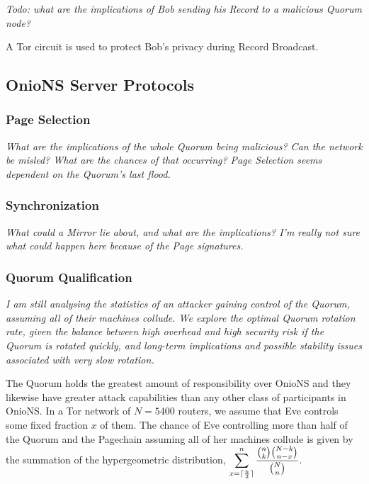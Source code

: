\emph{Todo: what are the implications of Bob sending his Record to a malicious Quorum node?}

A Tor circuit is used to protect Bob's privacy during Record Broadcast.

\subsection{OnioNS Server Protocols}

\subsubsection{Page Selection}

\emph{What are the implications of the whole Quorum being malicious? Can the network be misled? What are the chances of that occurring? Page Selection seems dependent on the Quorum's last flood.}

\subsubsection{Synchronization}

\emph{What could a Mirror lie about, and what are the implications? I'm really not sure what could happen here because of the Page signatures.}

\subsubsection{Quorum Qualification}

\emph{I am still analysing the statistics of an attacker gaining control of the Quorum, assuming all of their machines collude. We explore the optimal Quorum rotation rate, given the balance between high overhead and high security risk if the Quorum is rotated quickly, and long-term implications and possible stability issues associated with very slow rotation.}

The Quorum holds the greatest amount of responsibility over OnioNS and they likewise have greater attack capabilities than any other class of participants in OnioNS. In a Tor network of $ N = 5400 $ routers, we assume that Eve controls some fixed fraction $ x $ of them. The chance of Eve controlling more than half of the Quorum and the Pagechain assuming all of her machines collude is given by the summation of the hypergeometric distribution, $ \displaystyle\sum_{x=\lceil\frac{n}{2}\rceil}^{n} \frac{\binom{n}{k}\binom{N-k}{n-x}}{\binom{N}{n}} $. 

